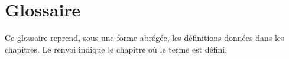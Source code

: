 
\chapter{Glossaire}
\label{ann:glossaire}

Ce glossaire reprend, sous une forme abrégée, les définitions données dans
les chapitres. Le renvoi indique le chapitre où le terme est défini.

